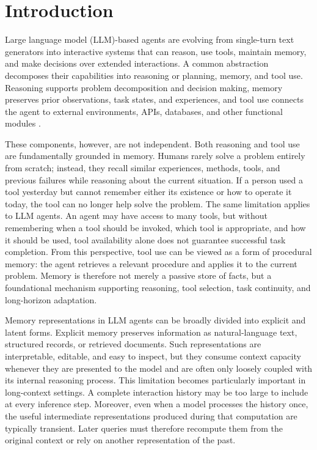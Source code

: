 \section{Introduction}
\label{sec:introduction}

Large language model (LLM)-based agents are evolving from single-turn text generators into interactive systems that can reason, use tools, maintain memory, and make decisions over extended interactions. A common abstraction decomposes their capabilities into reasoning or planning, memory, and tool use. Reasoning supports problem decomposition and decision making, memory preserves prior observations, task states, and experiences, and tool use connects the agent to external environments, APIs, databases, and other functional modules \cite{zhao2023llm_agent_survey,wang2024survey_autonomous_agents,zhang2024survey_memory_llm_agents}.

These components, however, are not independent. Both reasoning and tool use are fundamentally grounded in memory. Humans rarely solve a problem entirely from scratch; instead, they recall similar experiences, methods, tools, and previous failures while reasoning about the current situation. If a person used a tool yesterday but cannot remember either its existence or how to operate it today, the tool can no longer help solve the problem. The same limitation applies to LLM agents. An agent may have access to many tools, but without remembering when a tool should be invoked, which tool is appropriate, and how it should be used, tool availability alone does not guarantee successful task completion. From this perspective, tool use can be viewed as a form of procedural memory: the agent retrieves a relevant procedure and applies it to the current problem. Memory is therefore not merely a passive store of facts, but a foundational mechanism supporting reasoning, tool selection, task continuity, and long-horizon adaptation.

Memory representations in LLM agents can be broadly divided into explicit and latent forms. Explicit memory preserves information as natural-language text, structured records, or retrieved documents. Such representations are interpretable, editable, and easy to inspect, but they consume context capacity whenever they are presented to the model and are often only loosely coupled with its internal reasoning process. This limitation becomes particularly important in long-context settings. A complete interaction history may be too large to include at every inference step. Moreover, even when a model processes the history once, the useful intermediate representations produced during that computation are typically transient. Later queries must therefore recompute them from the original context or rely on another representation of the past.

